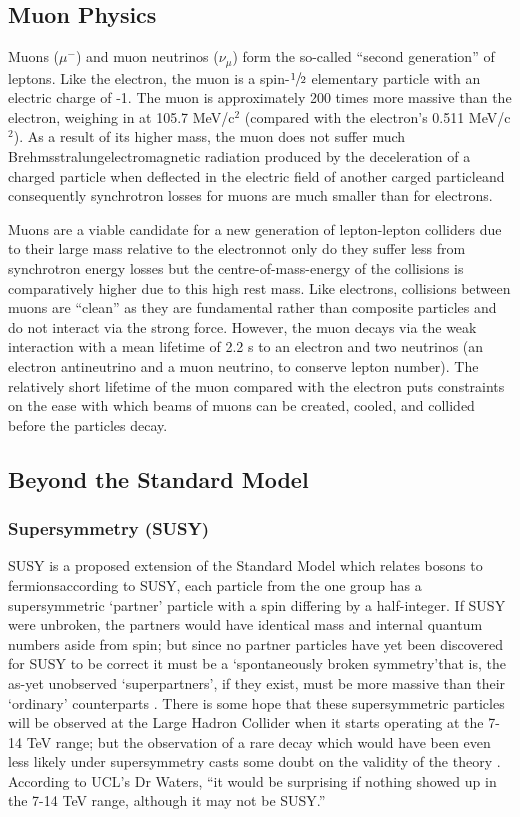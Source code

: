 \subsection{Muon Physics}
Muons ($\mu^{-}$) and muon neutrinos ($\nu_{\mu}$) form the so-called ``second generation'' of leptons. Like the electron, the muon is a spin-$\sfrac{1}{2}$ elementary particle with an electric charge of -1. The muon is approximately 200 times more massive than the electron, weighing in at 105.7 MeV/c$^{2}$ (compared with the electron's 0.511 MeV/c$^{2}$). As a result of its higher mass, the muon does not suffer much Brehmsstralung\textemdash electromagnetic radiation produced by the deceleration of a charged particle when deflected in the electric field of another carged particle\textemdash and consequently synchrotron losses for muons are much smaller than for electrons.

Muons are a viable candidate for a new generation of lepton-lepton colliders due to their large mass relative to the electron\textemdash not only do they suffer less from synchrotron energy losses but the centre-of-mass-energy of the collisions is comparatively higher due to this high rest mass. Like electrons, collisions between muons are ``clean'' as they are fundamental rather than composite particles and do not interact via the strong force. However,  the muon decays via the weak interaction with a mean lifetime of 2.2 \textmu s to an electron and two neutrinos (an electron antineutrino and a muon neutrino, to conserve lepton number). The relatively short lifetime of the muon compared with the electron puts constraints on the ease with which beams of muons can be created, cooled, and collided before the particles decay.

\subsection{Beyond the Standard Model}
\subsubsection{Supersymmetry (SUSY)}
SUSY is a proposed extension of the Standard Model which relates bosons to fermions\textemdash according to SUSY, each particle from the one group has a supersymmetric ‘partner' particle with a spin differing by a half-integer. If SUSY were unbroken, the partners would have identical mass and internal quantum numbers aside from spin; but since no partner particles have yet been discovered for SUSY to be correct it must be a ‘spontaneously broken symmetry'\textemdash that is, the as-yet unobserved ‘superpartners', if they exist, must be more massive than their ‘ordinary' counterparts \cite{CERN:Supersymmetry}. There is some hope that these supersymmetric particles will be observed at the Large Hadron Collider when it starts operating at the 7-14 TeV range; but the observation of a rare decay which would have been even less likely under supersymmetry casts some doubt on the validity of the theory \cite{BBC:SUSY}. According to UCL's Dr Waters, ``it would be surprising if nothing showed up in the 7-14 TeV range, although it may not be SUSY.'' \cite{Waters:Interview}

